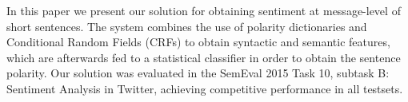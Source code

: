 In this paper we present our solution for obtaining sentiment at message-level of short sentences. The system combines the use of polarity dictionaries and Conditional Random Fields (CRFs) to obtain syntactic and semantic features, which are afterwards fed to a statistical classifier in order to obtain the sentence polarity. Our solution was evaluated in the SemEval 2015 Task 10, subtask B: Sentiment Analysis in Twitter, achieving competitive performance in all testsets.
